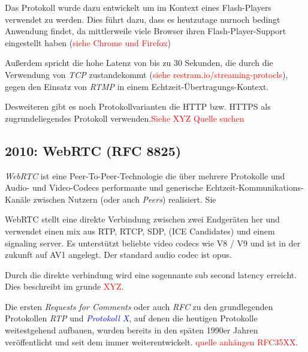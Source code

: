 \documentclass[journal]{IEEEtran}
\begin{document}
Das Protokoll wurde dazu entwickelt um im Kontext eines Flash-Players verwendet
zu werden. Dies führt dazu, dass es heutzutage nurnoch bedingt Anwendung
findet, da mittlerweile viele Browser ihren Flash-Player-Support eingestellt
haben (\textcolor{red}{siehe Chrome und Firefox}) %

Außerdem spricht die hohe Latenz von bis zu 30 Sekunden, die durch die
Verwendung von \textit{TCP} zustandekommt (\textcolor{red}{siehe
restram.io/streaming-protocls}), gegen den Einsatz von \textit{RTMP} in einem
Echtzeit-Übertragungs-Kontext.

Desweiteren gibt es noch Protokollvarianten die HTTP bzw. HTTPS als zugrundeliegendes
Protokoll verwenden.\textcolor{red}{Siehe XYZ Quelle suchen}

\subsection{2010: WebRTC (RFC 8825)}

\textit{WebRTC} ist eine Peer-To-Peer-Technologie die über mehrere Protokolle
und Audio- und Video-Codecs performante und generische
Echtzeit-Kommunikations-Kanäle zwischen Nutzern (oder auch \textit{Peers})
realisiert. Sie 

WebRTC stellt eine direkte Verbindung zwischen zwei Endgeräten her und
verwendet einen mix aus RTP, RTCP, SDP, (ICE Candidates) und einem signaling
server. Es unterstützt beliebte video codecs wie V8 / V9 und ist in der zukunft 
auf AV1 angelegt. Der standard audio codec ist opus.

Durch die direkte verbindung wird eine sogennante sub second latency erreicht.
Dies beschreibt im grunde \textcolor{red}{XYZ}.





Die ersten \textit{Requests for Comments} oder auch \textit{RFC} zu
den grundlegenden Protokollen \textit{RTP} und
\textit{\textcolor{blue}{Protokoll X}}, auf denen die heutigen Protokolle
weitestgehend aufbauen, wurden bereits in den späten 1990er Jahren
veröffentlicht und seit dem immer weiterentwickelt. \textcolor{red}{quelle
anhängen RFC35XX}.
\end{document}
